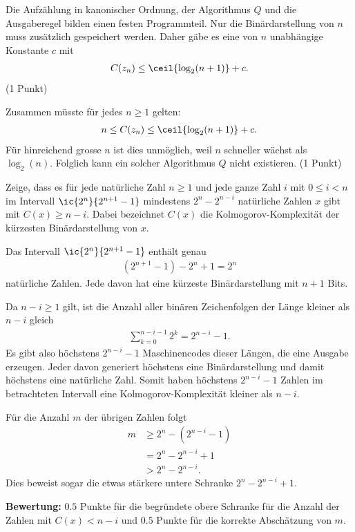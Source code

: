 \begin{questions}
\begin{solution}
		Die Aufzählung in kanonischer Ordnung, der Algorithmus $Q$ und die Ausgaberegel bilden einen festen Programmteil. Nur die Binärdarstellung von $n$ muss zusätzlich gespeichert werden. Daher gäbe es eine von $n$ unabhängige Konstante $c$ mit
		\begin{align*}
			C(z_n)\leq\ceil{\log_2(n+1)}+c.
		\end{align*}
		(1 Punkt)

		Zusammen müsste für jedes $n\geq1$ gelten:
		\begin{align*}
			n\leq C(z_n)\leq\ceil{\log_2(n+1)}+c.
		\end{align*}
		Für hinreichend grosse $n$ ist dies unmöglich, weil $n$ schneller wächst als $\log_2(n)$. Folglich kann ein solcher Algorithmus $Q$ nicht existieren. (1 Punkt)
	\end{solution}



	\question[1]
	Zeige, dass es für jede natürliche Zahl $n\geq1$ und jede ganze Zahl $i$ mit $0\leq i<n$ im Intervall $\ic{2^n}{2^{n+1}-1}$ mindestens $2^n-2^{n-i}$ natürliche Zahlen $x$ gibt mit $C(x)\geq n-i$. Dabei bezeichnet $C(x)$ die Kolmogorov-Komplexität der kürzesten Binärdarstellung von $x$.
	\begin{solution}
		Das Intervall $\ic{2^n}{2^{n+1}-1}$ enthält genau
		\begin{align*}
			(2^{n+1}-1)-2^n+1=2^n
		\end{align*}
		natürliche Zahlen. Jede davon hat eine kürzeste Binärdarstellung mit $n+1$ Bits.

		Da $n-i\geq1$ gilt, ist die Anzahl aller binären Zeichenfolgen der Länge kleiner als $n-i$ gleich
		\begin{align*}
			\sum_{k=0}^{n-i-1}2^k=2^{n-i}-1.
		\end{align*}
		Es gibt also höchstens $2^{n-i}-1$ Maschinencodes dieser Längen, die eine Ausgabe erzeugen. Jeder davon generiert höchstens eine Binärdarstellung und damit höchstens eine natürliche Zahl. Somit haben höchstens $2^{n-i}-1$ Zahlen im betrachteten Intervall eine Kolmogorov-Komplexität kleiner als $n-i$.

		Für die Anzahl $m$ der übrigen Zahlen folgt
		\begin{align*}
			m&\geq2^n-(2^{n-i}-1)\\
			 &=2^n-2^{n-i}+1\\
			 &>2^n-2^{n-i}.
		\end{align*}
		Dies beweist sogar die etwas stärkere untere Schranke $2^n-2^{n-i}+1$.

		\textbf{Bewertung:} $0.5$ Punkte für die begründete obere Schranke für die Anzahl der Zahlen mit $C(x)<n-i$ und $0.5$ Punkte für die korrekte Abschätzung von $m$.
	\end{solution}

\end{questions}
